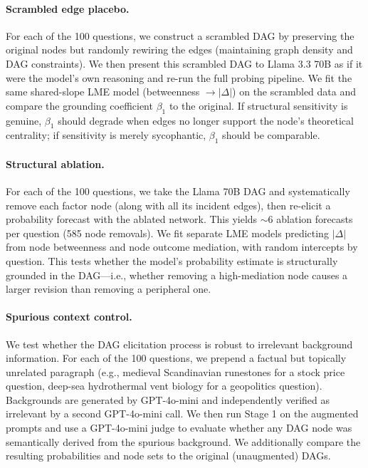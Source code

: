 \documentclass[11pt]{article}
\begin{document}
\paragraph{Scrambled edge placebo.} For each of the 100 questions, we construct a scrambled DAG by preserving the original nodes but randomly rewiring the edges (maintaining graph density and DAG constraints). We then present this scrambled DAG to Llama 3.3 70B as if it were the model's own reasoning and re-run the full probing pipeline. We fit the same shared-slope LME model (betweenness $\rightarrow |\Delta|$) on the scrambled data and compare the grounding coefficient $\beta_1$ to the original. If structural sensitivity is genuine, $\beta_1$ should degrade when edges no longer support the node's theoretical centrality; if sensitivity is merely sycophantic, $\beta_1$ should be comparable.

\paragraph{Structural ablation.} For each of the 100 questions, we take the Llama 70B DAG and systematically remove each factor node (along with all its incident edges), then re-elicit a probability forecast with the ablated network. This yields ${\sim}$6 ablation forecasts per question (585 node removals). We fit separate LME models predicting $|\Delta|$ from node betweenness and node outcome mediation, with random intercepts by question. This tests whether the model's probability estimate is structurally grounded in the DAG---i.e., whether removing a high-mediation node causes a larger revision than removing a peripheral one.

\paragraph{Spurious context control.} We test whether the DAG elicitation process is robust to irrelevant background information. For each of the 100 questions, we prepend a factual but topically unrelated paragraph (e.g., medieval Scandinavian runestones for a stock price question, deep-sea hydrothermal vent biology for a geopolitics question). Backgrounds are generated by GPT-4o-mini and independently verified as irrelevant by a second GPT-4o-mini call. We then run Stage 1 on the augmented prompts and use a GPT-4o-mini judge to evaluate whether any DAG node was semantically derived from the spurious background. We additionally compare the resulting probabilities and node sets to the original (unaugmented) DAGs.
\end{document}
